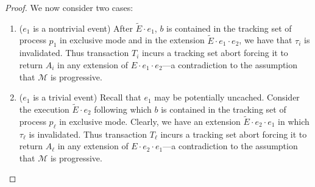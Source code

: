 \begin{proof}
We now consider two cases:
\begin{enumerate}
\item 
($e_1$ is a nontrivial event)
After $\tilde E\cdot e_1$, $b$ is contained in the tracking set of process
$p_1$ in exclusive mode and in the extension $\tilde E\cdot e_1 \cdot e_2$, we have that
$\tau_i$ is invalidated. Thus transaction $T_i$ incurs a tracking set abort forcing
it to return $A_i$ in any extension of $E\cdot e_1\cdot e_2$---a contradiction
to the assumption that $\mathcal{M}$ is progressive.   
\item
($e_1$ is a trivial event)
Recall that $e_1$ may be potentially uncached.
Consider the execution $\tilde E\cdot e_2$ following which $b$ is contained in the tracking set of process
$p_{\ell}$ in exclusive mode. Clearly, we have an extension $\tilde E\cdot e_2 \cdot e_1$ in which
$\tau_{\ell}$ is invalidated. Thus transaction $T_{\ell}$ incurs a tracking set abort forcing
it to return $A_{\ell}$ in any extension of $E\cdot e_2\cdot e_1$---a contradiction
to the assumption that $\mathcal{M}$ is progressive.   
\end{enumerate}
\end{proof}
%
